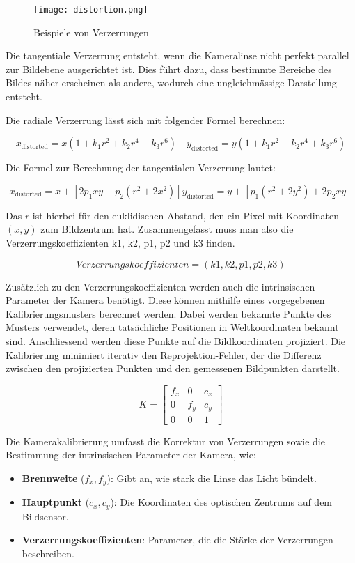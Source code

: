 \begin{figure}[H]
    \centering
    \texttt{[image: distortion.png]}
    \caption{Beispiele von Verzerrungen}
    \label{fig:distortion}
\end{figure}

Die tangentiale Verzerrung entsteht, wenn die Kameralinse nicht perfekt parallel zur Bildebene ausgerichtet
ist. Dies führt dazu, dass bestimmte Bereiche des Bildes näher erscheinen als andere, wodurch eine ungleichmässige
Darstellung entsteht. 

Die radiale Verzerrung lässt sich mit folgender Formel berechnen:

\[
x_\text{distorted} = x(1 + k_1r^2 + k_2r^4 + k_3r^6) \quad
y_\text{distorted} = y(1 + k_1r^2 + k_2r^4 + k_3r^6)
\]

Die Formel zur Berechnung der tangentialen Verzerrung lautet:

\[
x_\text{distorted} = x + \left[ 2p_1xy + p_2(r^2 + 2x^2) \right]
y_\text{distorted} = y + \left[ p_1(r^2 + 2y^2) + 2p_2xy \right]
\]

Das \(r\) ist hierbei für den euklidischen Abstand, den ein Pixel mit Koordinaten \((x, y)\) zum Bildzentrum hat.
Zusammengefasst muss man also die Verzerrungskoeffizienten k1, k2, p1, p2 und k3 finden.

\[
Verzerrungskoeffizienten = (k1, k2, p1, p2, k3)
\]

Zusätzlich zu den Verzerrungskoeffizienten werden auch die intrinsischen Parameter der Kamera benötigt. Diese können 
mithilfe eines vorgegebenen Kalibrierungsmusters berechnet werden. Dabei werden bekannte Punkte des Musters verwendet,
deren tatsächliche Positionen in Weltkoordinaten bekannt sind. Anschliessend werden diese Punkte auf die Bildkoordinaten
projiziert. Die Kalibrierung minimiert iterativ den Reprojektion-Fehler, der die Differenz zwischen den projizierten 
Punkten und den gemessenen Bildpunkten darstellt.

\[
K =
\begin{bmatrix}
f_x & 0 & c_x \\
0 & f_y & c_y \\
0 & 0 & 1
\end{bmatrix}
\]

Die Kamerakalibrierung umfasst die Korrektur von Verzerrungen sowie die Bestimmung der 
intrinsischen Parameter der Kamera, wie:

\begin{itemize}
    \item \textbf{Brennweite} (\( f_x, f_y \)): Gibt an, wie stark die Linse das Licht bündelt.
    \item \textbf{Hauptpunkt} (\( c_x, c_y \)): Die Koordinaten des optischen Zentrums auf dem Bildsensor.
    \item \textbf{Verzerrungskoeffizienten}: Parameter, die die Stärke der Verzerrungen beschreiben.
\end{itemize}


